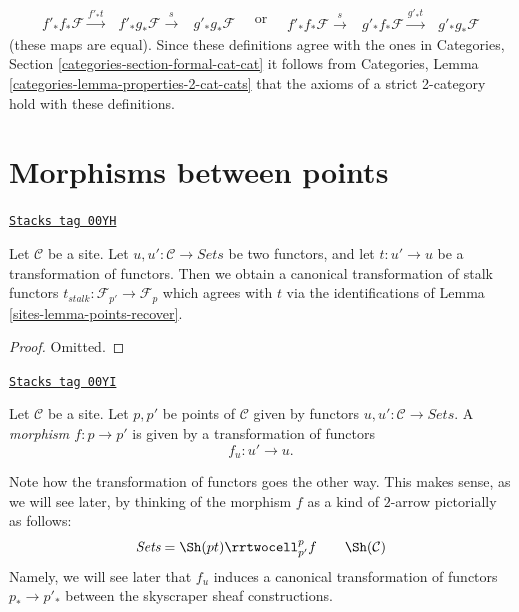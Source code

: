 $$
\begin{array}{ccc}f'_*f_*\mathcal{F}
\overset{f'_*t}{\longrightarrow} & f'_*g_*\mathcal{F}
\overset{s}{\longrightarrow} & g'_*g_*\mathcal{F}\end{array}
\quad\text{or}\quad
\begin{array}{ccc}f'_*f_*\mathcal{F}
\overset{s}{\longrightarrow} & g'_*f_*\mathcal{F}
\overset{g'_*t}{\longrightarrow} & g'_*g_*\mathcal{F}\end{array}
$$
(these maps are equal). Since these definitions agree with the ones in
Categories, Section \ref{categories-section-formal-cat-cat}
it follows from
Categories, Lemma \ref{categories-lemma-properties-2-cat-cats}
that the axioms of a strict 2-category hold with these definitions.

\section{Morphisms between points}
\label{sites-section-morphisms-points}
\begin{lemma}
\label{sites-lemma-maps-u-points}
\href{https://stacks.math.columbia.edu/tag/00YH}{\texttt{Stacks tag 00YH}}

Let $\mathcal{C}$ be a site.
Let $u, u' : \mathcal{C} \to \textit{Sets}$ be two
functors, and let $t : u' \to u$ be a transformation of functors.
Then we obtain a canonical transformation of stalk
functors $t_{stalk} : \mathcal{F}_{p'} \to \mathcal{F}_p$
which agrees with $t$ via the identifications of
Lemma \ref{sites-lemma-points-recover}.
\end{lemma}

\begin{proof}
Omitted.
\end{proof}

\begin{definition}
\label{sites-definition-morphism-points}
\href{https://stacks.math.columbia.edu/tag/00YI}{\texttt{Stacks tag 00YI}}

Let $\mathcal{C}$ be a site. Let $p, p'$ be points of $\mathcal{C}$
given by functors $u, u' : \mathcal{C} \to \textit{Sets}$.
A {\it morphism $f : p \to p'$} is given by a transformation of
functors
$$
f_u : u' \to u.
$$
\end{definition}

Note how the transformation of functors goes the other way.
This makes sense, as we will see later, by thinking of
the morphism $f$ as a kind of $2$-arrow pictorially as
follows:
$$
\begin{array}{ccc}\textit{Sets}
=
\Sh(pt)
\rrtwocell^p_{p'}{f} &  & \Sh(\mathcal{C})\end{array}
$$
Namely, we will see later that $f_u$ induces a canonical
transformation of functors $p_* \to p'_*$ between
the skyscraper sheaf constructions.


